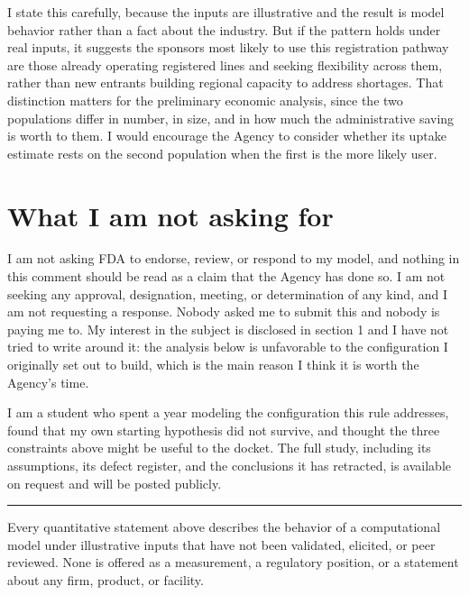 \documentclass[11pt,letterpaper]{article}
\begin{document}
I state this carefully, because the inputs are illustrative and the result is model behavior rather
than a fact about the industry. But if the pattern holds under real inputs, it suggests the sponsors
most likely to use this registration pathway are those already operating registered lines and
seeking flexibility across them, rather than new entrants building regional capacity to address
shortages. That distinction matters for the preliminary economic analysis, since the two populations
differ in number, in size, and in how much the administrative saving is worth to them. I would
encourage the Agency to consider whether its uptake estimate rests on the second population when the
first is the more likely user.

\section{What I am not asking for}

I am not asking FDA to endorse, review, or respond to my model, and nothing in this comment should
be read as a claim that the Agency has done so. I am not seeking any approval, designation, meeting,
or determination of any kind, and I am not requesting a response. Nobody asked me to submit this and
nobody is paying me to. My interest in the subject is disclosed in section 1 and I have not tried to
write around it: the analysis below is unfavorable to the configuration I originally set out to
build, which is the main reason I think it is worth the Agency's time.

I am a student who spent a year modeling the configuration this rule addresses, found that my own
starting hypothesis did not survive, and thought the three constraints above might be useful to the
docket. The full study, including its assumptions, its defect register, and the conclusions it has
retracted, is available on request and will be posted publicly.

\vspace{1.2ex}
\hrule
\vspace{0.8ex}
{\footnotesize Every quantitative statement above describes the behavior of a computational model
under illustrative inputs that have not been validated, elicited, or peer reviewed. None is offered
as a measurement, a regulatory position, or a statement about any firm, product, or facility.}
\end{document}
